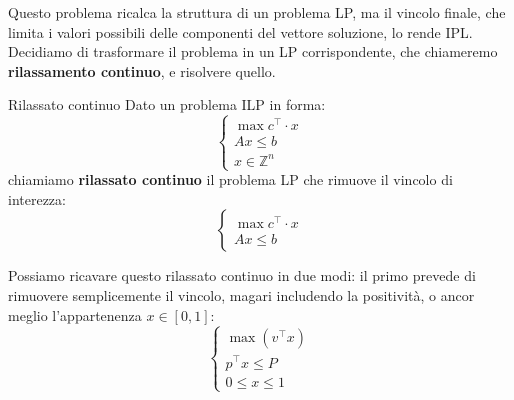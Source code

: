 \documentclass[a4paper,11pt]{article}
\begin{document}
Questo problema ricalca la struttura di un problema LP, ma il vincolo finale, che limita i valori possibili delle componenti del vettore soluzione, lo rende IPL.
Decidiamo di trasformare il problema in un LP corrispondente, che chiameremo \textbf{rilassamento continuo}, e risolvere quello.

\begin{definition}{Rilassato continuo}
	Dato un problema ILP in forma:
	\[
		\begin{cases}
			\max c^\intercal \cdot x \\ 
			Ax \leq b \\ 
			x \in \mathbb{Z}^n
		\end{cases}
	\]
	chiamiamo \textbf{rilassato continuo} il problema LP che rimuove il vincolo di interezza:
	\[
		\begin{cases}
			\max c^\intercal \cdot x \\ 
			Ax \leq b 
		\end{cases}	
	\]
\end{definition}

Possiamo ricavare questo rilassato continuo in due modi: il primo prevede di rimuovere semplicemente il vincolo, magari includendo la positività, o ancor meglio l'appartenenza $x \in [0, 1]$:
\[
	\begin{cases}
		\max \left( v^\intercal x \right) \\
		p^\intercal x \leq P \\
		0 \leq x \leq 1
	\end{cases}
\]
\end{document}
